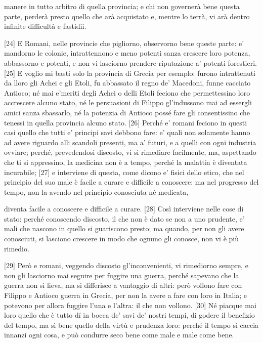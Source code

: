 \quebra

\noindent{}manere in tutto arbitro di
quella provincia; e chi non governerà bene questa parte, perderà presto
quello che arà acquistato e, mentre lo terrà, vi arà dentro infinite
difficultà e fastidii.

{[}24{]} E Romani, nelle provincie che pigliorno, observorno bene queste
parte: e' mandorno le colonie, intrattennono e meno potenti sanza
crescere loro potenza, abbassorno e potenti, e non vi lasciorno prendere
riputazione a' potenti forestieri. {[}25{]} E voglio mi basti solo la
provincia di Grecia per esemplo: furono intrattenuti da lloro gli Achei
e gli Etoli, fu abbassato il regno de' Macedoni, funne cacciato Antioco;
né mai e'meriti degli Achei o delli Etoli feciono che permettessino loro
accrescere alcuno stato, né le persuasioni di Filippo gl'indussono mai
ad essergli amici sanza sbassarlo, né la potenzia di Antioco possé fare
gli consentissino che tenessi in quella provincia alcuno stato. {[}26{]}
Perché e' romani feciono in questi casi quello che tutti e' principi
savi debbono fare: e' quali non solamente hanno ad avere riguardo alli
scandoli presenti, ma a' futuri, e a quelli con ogni industria ovviare;
perché, prevedendosi discosto, vi si rimediare facilmente, ma,
aspettando che ti si appressino, la medicina non è a tempo, perché la
malattia è diventata incurabile; {[}27{]} e interviene di questa, come
dicono e' fisici dello etico, che nel principio del suo male è facile a
curare e difficile a conoscere: ma nel progresso del tempo, non la
avendo nel principio conosciuta né medicata,

\quebra

\noindent{}diventa facile a conoscere
e difficile a curare. {[}28{]} Così interviene nelle cose di stato:
perché conoscendo discosto, il che non è dato se non a uno prudente, e'
mali che nascono in quello si guariscono presto; ma quando, per non gli
avere conosciuti, si lasciono crescere in modo che ognuno gli conosce,
non vi è più rimedio.

{[}29{]} Però e romani, veggendo discosto gl'inconvenienti, vi
rimediorno sempre, e non gli lasciorno mai seguire per fuggire una
guerra, perché sapevano che la guerra non si lieva, ma si differisce a
vantaggio di altri: però vollono fare con Filippo e Antioco guerra in
Grecia, per non la avere a fare con loro in Italia; e potevono per
allora fuggire l'una e l'altra: il che non vollono. {[}30{]} Né piacque
mai loro quello che è tutto dí in bocca de' savi de' nostri tempi, di
godere il benefizio del tempo, ma sì bene quello della virtù e prudenza
loro: perché il tempo si caccia innanzi ogni cosa, e può condurre seco
bene come male e male come bene.

